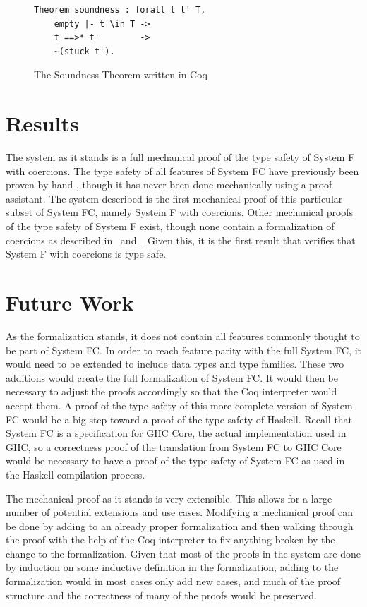 \documentclass{sig-alternate}
\begin{document}
\begin{figure}[h!]
\begin{lstlisting}
Theorem soundness : forall t t' T,
    empty |- t \in T ->
    t ==>* t'        ->
    ~(stuck t').
\end{lstlisting}
\caption{The Soundness Theorem written in Coq}
\label{fig:soundness-coq}
\end{figure}

\section{Results}
\label{sec:results}

The system as it stands is a full mechanical proof of the type safety of System F with coercions. The type safety of all features of System FC have previously been proven by hand \cite{conf/tldi/SulzmannCJD07}, though it has never been done mechanically using a proof assistant. The system described is the first mechanical proof of this particular subset of System FC, namely System F with coercions. Other mechanical proofs of the type safety of System F exist, though none contain a formalization of coercions as described in~\cite{Breitner:2014:SZC:2628136.2628141} and~\cite{DBLP:conf/tldi/YorgeyWCJVM12}. Given this, it is the first result that verifies that System F with coercions is type safe. 

\section{Future Work}
\label{sec:future-work}

As the formalization stands, it does not contain all features commonly thought to be part of System FC. In order to reach feature parity with the full System FC, it would need to be extended to include data types and type families. These two additions would create the full formalization of System FC. It would then be necessary to adjust the proofs accordingly so that the Coq interpreter would accept them. A proof of the type safety of this more complete version of System FC would be a big step toward a proof of the type safety of Haskell. Recall that System FC is a specification for GHC Core, the actual implementation used in GHC, so a correctness proof of the translation from System FC to GHC Core would be necessary to have a proof of the type safety of System FC as used in the Haskell compilation process.

The mechanical proof as it stands is very extensible. This allows for a large number of potential extensions and use cases. Modifying a mechanical proof can be done by adding to an already proper formalization and then walking through the proof with the help of the Coq interpreter to fix anything broken by the change to the formalization. Given that most of the proofs in the system are done by induction on some inductive definition in the formalization, adding to the formalization would in most cases only add new cases, and much of the proof structure and the correctness of many of the proofs would be preserved.
\end{document}
